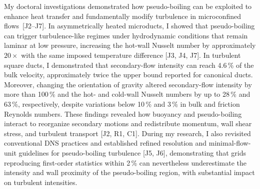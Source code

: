\documentclass[11pt]{article}
\begin{document}
My doctoral investigations demonstrated how pseudo-boiling can be exploited to enhance heat transfer and fundamentally modify turbulence in microconfined flows~[J2--J7].
In asymmetrically heated microducts, I showed that pseudo-boiling can trigger turbulence-like regimes under hydrodynamic conditions that remain laminar at low pressure, increasing the hot-wall Nusselt number by approximately $20\times$ with the same imposed temperature difference [J3, J4, J7].
In turbulent square ducts, I demonstrated that secondary-flow intensity can reach 4.6\,\% of the bulk velocity, approximately twice the upper bound reported for canonical ducts.
Moreover, changing the orientation of gravity altered secondary-flow intensity by more than 100\,\% and the hot- and cold-wall Nusselt numbers by up to 28\,\% and 63\,\%, respectively, despite variations below 10\,\% and 3\,\% in bulk and friction Reynolds numbers.
These findings revealed how buoyancy and pseudo-boiling interact to reorganize secondary motions and redistribute momentum, wall shear stress, and turbulent transport [J2, R1, C1].
During my research, I also revisited conventional DNS practices and established refined resolution and minimal-flow-unit guidelines for pseudo-boiling turbulence [J5, J6], demonstrating that grids reproducing first-order statistics within 2\,\% can nevertheless underestimate the intensity and wall proximity of the pseudo-boiling region, with substantial impact on turbulent intensities.
\end{document}
